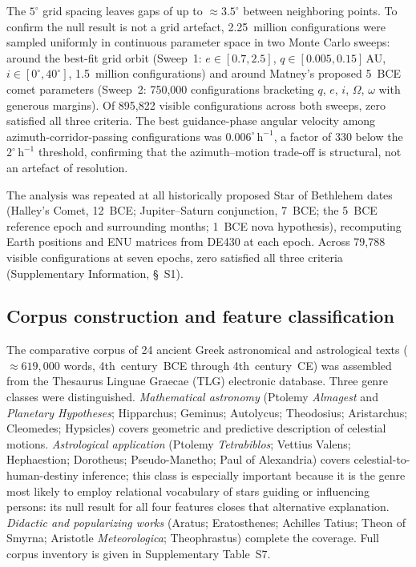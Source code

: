 \documentclass[sn-nature]{sn-jnl}
\begin{document}
The $5^\circ$ grid spacing leaves gaps of up to ${\approx}3.5^\circ$
between neighboring points. To confirm the null result is not a grid
artefact, 2.25~million configurations were sampled uniformly in continuous
parameter space in two Monte Carlo sweeps: around the best-fit grid orbit
(Sweep~1: $e\in[0.7,2.5]$, $q\in[0.005,0.15]$\,AU, $i\in[0^\circ,40^\circ]$,
1.5~million configurations) and around Matney's proposed 5~BCE comet
parameters (Sweep~2: 750{,}000 configurations bracketing $q$, $e$, $i$,
$\Omega$, $\omega$ with generous margins). Of 895{,}822 visible
configurations across both sweeps, zero satisfied all three criteria.
The best guidance-phase angular velocity among azimuth-corridor-passing
configurations was $0.006^\circ\,\mathrm{h}^{-1}$, a factor of 330 below
the $2^\circ\,\mathrm{h}^{-1}$ threshold, confirming that the
azimuth--motion trade-off is structural, not an artefact of resolution.

The analysis was repeated at all historically proposed Star of Bethlehem
dates (Halley's Comet, 12~BCE; Jupiter--Saturn conjunction, 7~BCE;
the 5~BCE reference epoch and surrounding months; 1~BCE nova hypothesis),
recomputing Earth positions and ENU matrices from DE430 at each epoch.
Across 79{,}788 visible configurations at seven epochs, zero satisfied all
three criteria (Supplementary Information, \S~S1).

\subsection{Corpus construction and feature classification}
\label{subsec:corpus_methods}

The comparative corpus of 24 ancient Greek astronomical and astrological
texts ($\approx\!619{,}000$ words, 4th~century~BCE through 4th~century~CE)
was assembled from the Thesaurus Linguae Graecae (TLG) electronic
database\cite{tlg}. Three genre classes were distinguished.
\textit{Mathematical astronomy} (Ptolemy \textit{Almagest} and
\textit{Planetary Hypotheses}; Hipparchus; Geminus; Autolycus; Theodosius;
Aristarchus; Cleomedes; Hypsicles) covers geometric and predictive description
of celestial motions. \textit{Astrological application} (Ptolemy
\textit{Tetrabiblos}; Vettius Valens; Hephaestion; Dorotheus;
Pseudo-Manetho; Paul of Alexandria) covers celestial-to-human-destiny
inference; this class is especially important because it is the genre most
likely to employ relational vocabulary of stars guiding or influencing
persons: its null result for all four features closes that alternative
explanation. \textit{Didactic and popularizing works} (Aratus; Eratosthenes;
Achilles Tatius; Theon of Smyrna; Aristotle \textit{Meteorologica};
Theophrastus) complete the coverage. Full corpus inventory is given in
Supplementary Table~S7.
\end{document}
